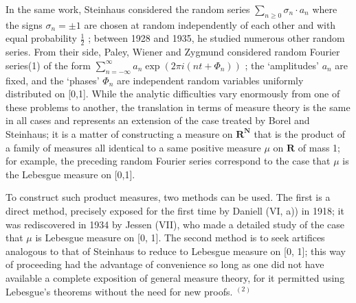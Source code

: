 In the same work, Steinhaus considered the random series \(\sum_{n\geqslant 0}\sigma_n\cdot a_n\) where the signs \(\sigma_{n} = \pm 1\) are chosen at random independently of each other and with equal probability \(\frac{1}{2}\) ; between 1928 and 1935, he studied numerous other random series. From their side, Paley, Wiener and Zygmund considered random Fourier series(1) of the form \(\sum_{n = -\infty}^{\infty}a_n\exp (2\pi i(nt + \Phi_n))\) ; the `amplitudes' \(a_{n}\) are fixed, and the `phases' \(\Phi_{n}\) are independent random variables uniformly distributed on {[}0,1{]}. While the analytic difficulties vary enormously from one of these problems to another, the translation in terms of measure theory is the same in all cases and represents an extension of the case treated by Borel and Steinhaus; it is a matter of constructing a measure on \(\mathbf{R}^{\mathbf{N}}\) that is the product of a family of measures all identical to a same positive measure \(\mu\) on \(\mathbf{R}\) of mass 1; for example, the preceding random Fourier series correspond to the case that \(\mu\) is the Lebesgue measure on {[}0,1{]}.

To construct such product measures, two methods can be used. The first is a direct method, precisely exposed for the first time by Daniell (VI, a)) in 1918; it was rediscovered in 1934 by Jessen (VII), who made a detailed study of the case that \(\mu\) is Lebesgue measure on {[}0, 1{]}. The second method is to seek artifices analogous to that of Steinhaus to reduce to Lebesgue measure on {[}0, 1{]}; this way of proceeding had the advantage of convenience so long as one did not have available a complete exposition of general measure theory, for it permitted using Lebesgue's theorems without the need for new proofs. \(^{(2)}\)

